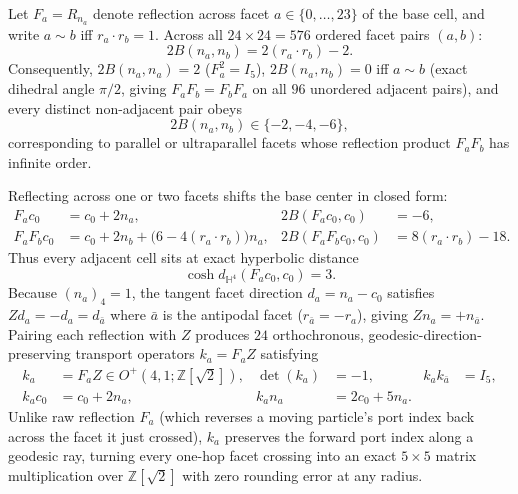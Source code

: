 \begin{theorem}
\label{thm:right-angled}
Let $F_a = R_{n_a}$ denote reflection across facet $a \in \{0,\dots,23\}$ of the base cell, and write $a \sim b$ iff $r_a \cdot r_b = 1$. Across all $24 \times 24 = 576$ ordered facet pairs $(a,b)$:
\begin{equation}
\label{eq:facet-gram}
2B(n_a, n_b) = 2(r_a \cdot r_b) - 2.
\end{equation}
Consequently, $2B(n_a, n_a) = 2$ ($F_a^2 = I_5$), $2B(n_a, n_b) = 0$ iff $a \sim b$ (exact dihedral angle $\pi/2$, giving $F_a F_b = F_b F_a$ on all $96$ unordered adjacent pairs), and every distinct non-adjacent pair obeys
\begin{equation}
\label{eq:nonadj-gram}
2B(n_a, n_b) \in \{-2, -4, -6\},
\end{equation}
corresponding to parallel or ultraparallel facets whose reflection product $F_a F_b$ has infinite order.
\end{theorem}

Reflecting across one or two facets shifts the base center in closed form:
\begin{align}
F_a c_0 &= c_0 + 2 n_a, & 2B(F_a c_0, c_0) &= -6, \label{eq:one-step-center}\\
F_a F_b c_0 &= c_0 + 2 n_b + \bigl(6 - 4(r_a \cdot r_b)\bigr) n_a, & 2B(F_a F_b c_0, c_0) &= 8(r_a \cdot r_b) - 18. \label{eq:two-step-center}
\end{align}
Thus every adjacent cell sits at exact hyperbolic distance
\begin{equation}
\label{eq:cell-dist}
\cosh d_{\mathbb{H}^4}(F_a c_0, c_0) = 3.
\end{equation}
Because $(n_a)_4 = 1$, the tangent facet direction $d_a = n_a - c_0$ satisfies $Z d_a = -d_a = d_{\bar{a}}$ where $\bar{a}$ is the antipodal facet ($r_{\bar{a}} = -r_a$), giving $Z n_a = +n_{\bar{a}}$. Pairing each reflection with $Z$ produces $24$ orthochronous, geodesic-direction-preserving transport operators $k_a = F_a Z$ satisfying
\begin{align}
k_a &= F_a Z \in O^+(4,1;\mathbb{Z}[\sqrt{2}]), & \det(k_a) &= -1, & k_a k_{\bar{a}} &= I_5, \label{eq:transport-ids}\\
k_a c_0 &= c_0 + 2 n_a, & k_a n_a &= 2 c_0 + 5 n_a. \label{eq:transport-act}
\end{align}
Unlike raw reflection $F_a$ (which reverses a moving particle's port index back across the facet it just crossed), $k_a$ preserves the forward port index along a geodesic ray, turning every one-hop facet crossing into an exact $5 \times 5$ matrix multiplication over $\mathbb{Z}[\sqrt{2}]$ with zero rounding error at any radius.


